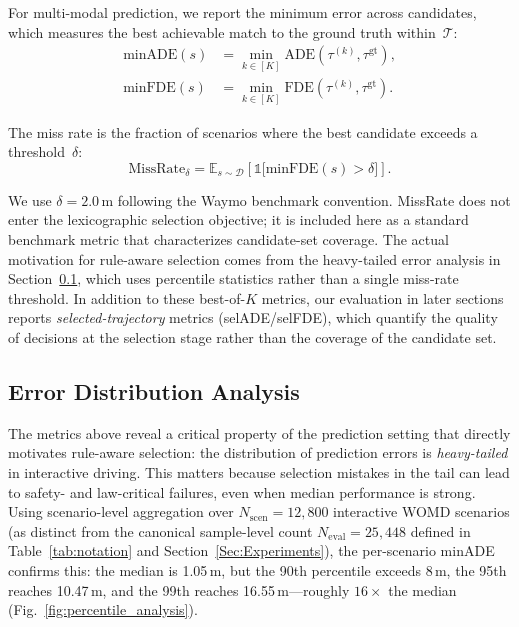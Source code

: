 \noindent
For multi-modal prediction, we report the minimum error across candidates, which measures the best achievable match to the ground truth
within~$\mathcal{T}$:
\begin{align}
\text{minADE}(s) &= \min_{k \in [K]} \text{ADE}(\tau^{(k)}, \tau^{\mathrm{gt}}), \\
\text{minFDE}(s) &= \min_{k \in [K]} \text{FDE}(\tau^{(k)}, \tau^{\mathrm{gt}}).
\end{align}

\begin{definition}
The miss rate is the fraction of scenarios where the best candidate exceeds a threshold~$\delta$:
\begin{equation}
\text{MissRate}_\delta = \mathbb{E}_{s \sim \mathcal{D}} \left[ \mathbb{1}\big[\text{minFDE}(s) > \delta\big] \right].
\end{equation}
\end{definition}

\noindent
We use $\delta = 2.0\,\mathrm{m}$ following the Waymo benchmark convention. MissRate does not enter the lexicographic selection objective; it is included here as a standard benchmark metric that characterizes candidate-set coverage.  The actual motivation for rule-aware selection comes from the heavy-tailed error analysis in Section~\ref{subsec:error_distribution}, which uses percentile statistics rather than a single miss-rate threshold. In addition to these best-of-$K$ metrics, our evaluation in later sections reports \emph{selected-trajectory} metrics (selADE/selFDE), which quantify the quality of decisions at the selection stage rather than the coverage of the candidate set.

\subsection{Error Distribution Analysis}
\label{subsec:error_distribution}

The metrics above reveal a critical property of the prediction setting that directly motivates rule-aware selection: the distribution of prediction errors is \emph{heavy-tailed} in interactive driving.  This matters because selection mistakes in the tail can lead to safety- and law-critical failures, even when median performance is strong.  Using scenario-level aggregation over $N_{\text{scen}}{=}12{,}800$ interactive WOMD scenarios (as distinct from the canonical sample-level count $N_{\text{eval}}{=}25{,}448$ defined in Table~\ref{tab:notation} and Section~\ref{Sec:Experiments}), the per-scenario minADE confirms this: the median is 1.05\,m, but the 90th percentile exceeds 8\,m, the 95th reaches 10.47\,m, and the 99th reaches 16.55\,m---roughly $16\times$ the median (Fig.~\ref{fig:percentile_analysis}).

